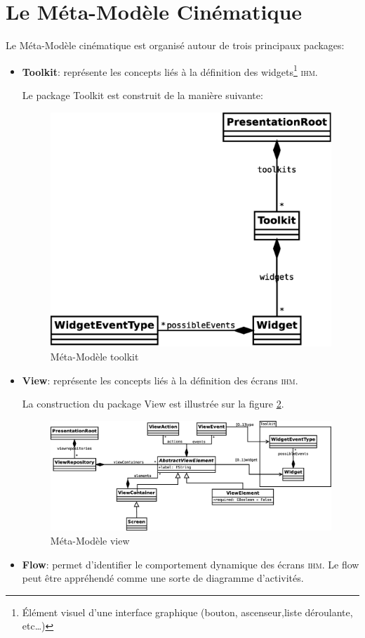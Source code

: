 \section{Le Méta-Modèle Cinématique}
Le Méta-Modèle cinématique est organisé autour de trois principaux packages:
\begin{itemize}
  \item \textbf{Toolkit}: représente les concepts liés à la définition des widgets\footnote{Élément visuel d'une interface graphique (bouton, ascenseur,liste déroulante, etc\dots)} \textsc{ihm}.

Le package Toolkit est construit de la manière suivante:

\begin{figure}[htb]
  \centering
  \includegraphics[scale=.3]{img/toolkit.eps}
  \caption{Méta-Modèle toolkit}
  \label{fig:toolkit}
\end{figure}
  \item \textbf{View}: représente les concepts liés à la définition des écrans \textsc{ihm}.

La construction du package View est illustrée sur la figure \ref{fig:view}.
\begin{figure}[H]
  \centering
  \includegraphics[scale=.3]{img/view.eps}
  \caption{Méta-Modèle view}
  \label{fig:view}
\end{figure}
  \item \textbf{Flow}: permet d'identifier le comportement dynamique des écrans \textsc{ihm}. Le flow peut être appréhendé comme une sorte de diagramme d'activités.


\end{itemize}
